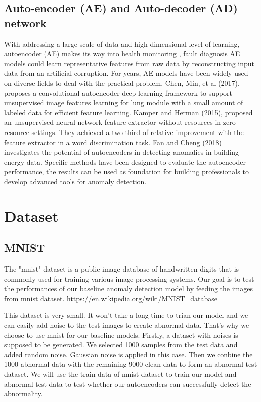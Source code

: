 \documentclass{article}
\begin{document}
\subsection{Auto-encoder (AE) and Auto-decoder (AD) network}
With addressing a large scale of data and high-dimensional level of learning, autoencoder (AE) makes its way into health monitoring \cite{AuthorRZ}, fault diagnosis AE models could learn representative features from raw data by reconstructing input data from an artificial corruption. For years, AE models have been widely used on diverse fields to deal with the practical problem. Chen, Min, et al (2017), proposes a convolutional autoencoder deep learning framework to support unsupervised image
features learning for lung module with a small amount of labeled data for efficient feature learning. Kamper and Herman (2015), proposed an unsupervised neural network feature extractor without resources in zero-resource settings. They achieved a two-third of relative improvement with the feature extractor in a word discrimination task. \cite{AuthorKa} Fan and Cheng (2018) investigates the potential of autoencoders in detecting anomalies in building energy data. Specific methods have been
designed to evaluate the autoencoder performance, the results can be used as foundation for building professionals to develop advanced tools for anomaly detection.   

\section{Dataset}
\subsection{MNIST}
The "mnist" dataset is a public image database of handwritten digits that is commonly used for training various image processing systems. Our goal is to test the performances of our baseline anomaly detection model by feeding the images from mnist dataset.
\url{https://en.wikipedia.org/wiki/MNIST_database}

This dataset is very small. It won't take a long time to trian our model and we can easily add noise to the test images to create abnormal data. That's why we choose to use mnist for our baseline models. Firstly, a dataset with noises is supposed to be generated. We selected 1000 samples from the test data and added random noise. Gaussian noise is applied in this case. Then we conbine the 1000 abnormal data with the remaining 9000 clean data to form an abnormal test dataset. We will use the
train data of mnist dataset to train our model and abnormal test data to test whether our autoencoders can successfully detect the abnormality.
\end{document}
